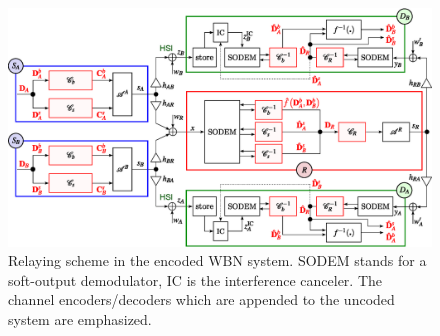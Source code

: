 \documentclass{article}
\begin{document}
\begin{figure}
\begin{centering}
\includegraphics[width=1\textwidth]{fig/butterfly-2level_processing_principleTWC-coded}
\par\end{centering}

\caption{Relaying scheme in the encoded WBN system. SODEM stands for a soft-output
demodulator, IC is the interference canceler. The channel encoders/decoders
which are appended to the uncoded system are emphasized. \label{fig:CTUpp_Information-flow-coded-block-scheme}}
\vspace*{-3ex}
\end{figure}
\end{document}
